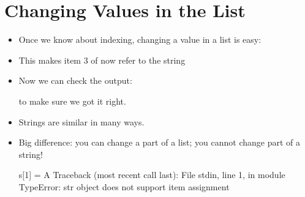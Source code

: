 \documentclass[letterpaper,10pt,english]{sphinxmanual}
\begin{document}
\section{Changing Values in the List}
\label{\detokenize{lecture_notes/lec08_lists1:changing-values-in-the-list}}\begin{itemize}
\item {} 
Once we know about indexing, changing a value in a list is easy:

%
\begin{sphinxVerbatim}[commandchars=\\\{\}]
\PYG{p}{[}\PYG{p}{]}  
\end{sphinxVerbatim}

\item {} 
This makes item 3 of  now refer to the string 

\item {} 
Now we can check the output:

%
\begin{sphinxVerbatim}[commandchars=\\\{\}]
\end{sphinxVerbatim}

to make sure we got it right.

\item {} 
Strings are similar in many ways.

%
\begin{sphinxVerbatim}[commandchars=\\\{\}]
  
\PYG{p}{[}\PYG{p}{]}
\PYG{p}{[}\PYG{p}{]}
\end{sphinxVerbatim}

\item {} 
Big difference: you can change a part of a list; you cannot
change part of a string!

%
\begin{sphinxVerbatim}[commandchars=\\\{\}]
\PYGZgt{}\PYGZgt{}\PYGZgt{} s[1] = \PYGZsq{}A\PYGZsq{}
Traceback (most recent call last):
File \PYGZdq{}\PYGZlt{}stdin\PYGZgt{}\PYGZdq{}, line 1, in \PYGZlt{}module\PYGZgt{}
TypeError: \PYGZsq{}str\PYGZsq{} object does not support item assignment
\end{sphinxVerbatim}

\end{itemize}
\end{document}
